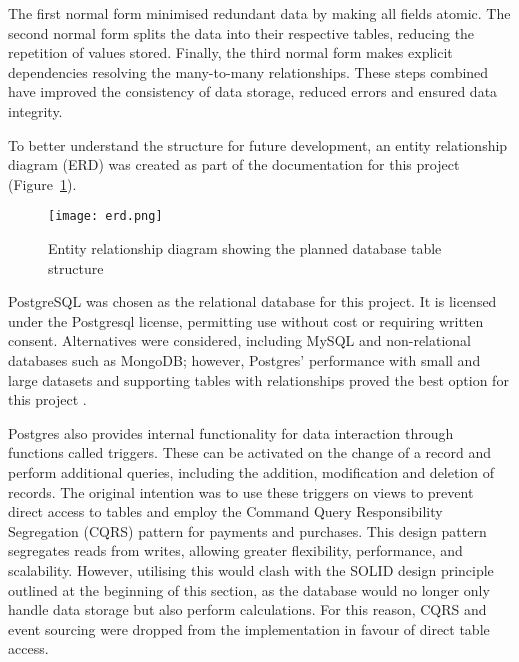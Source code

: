 The first normal form minimised redundant data by making all fields atomic. The second normal form splits the data into their respective tables, reducing the repetition of values stored. Finally, the third normal form makes explicit dependencies resolving the many-to-many relationships. These steps combined have improved the consistency of data storage, reduced errors and ensured data integrity.

To better understand the structure for future development, an entity relationship diagram (ERD) was created as part of the documentation for this project (Figure~\ref{fig:erd}).

\begin{figure}[ht!]
    \centerline{\texttt{[image: erd.png]}}
    \caption{Entity relationship diagram showing the planned database table structure}
    \label{fig:erd}
\end{figure}

PostgreSQL was chosen as the relational database for this project. It is licensed under the Postgresql license, permitting use without cost or requiring written consent. Alternatives were considered, including MySQL and non-relational databases such as MongoDB; however, Postgres' performance with small and large datasets and supporting tables with relationships proved the best option for this project \parencite{arctype_performance_2021}.

Postgres also provides internal functionality for data interaction through functions called triggers. These can be activated on the change of a record and perform additional queries, including the addition, modification and deletion of records. The original intention was to use these triggers on views to prevent direct access to tables and employ the Command Query Responsibility Segregation (CQRS) pattern for payments and purchases. This design pattern segregates reads from writes, allowing greater flexibility, performance, and scalability. However, utilising this would clash with the SOLID design principle outlined at the beginning of this section, as the database would no longer only handle data storage but also perform calculations. For this reason, CQRS and event sourcing were dropped from the implementation in favour of direct table access.



